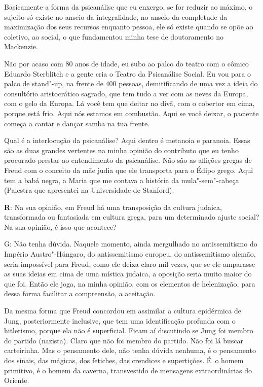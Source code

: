  

Basicamente a forma da psicanálise que eu enxergo, se for reduzir ao
máximo, o sujeito só existe no anseio da integralidade, no anseio da
completude da maximização dos seus recursos enquanto pessoa, ele só
existe quando se opõe ao coletivo, ao social, o que fundamentou minha
tese de doutoramento no Mackenzie.

 

Não por acaso com 80 anos de idade, eu subo ao palco do teatro com o
cômico Eduardo Sterblitch e a gente cria o Teatro da Psicanálise Social.
Eu vou para o palco de stand"-up, na frente de 400 pessoas, demitificando
de uma vez a ideia do consultório aristocrático sagrado, que tem tudo a
ver com as neves da Europa, com o gelo da Europa. Lá você tem que deitar
no divã, com o cobertor em cima, porque está frio. Aqui nós estamos em
combustão. Aqui se você deixar, o paciente começa a cantar e dançar
samba na tua frente.

 

Qual é a interlocução da psicanálise? Aqui dentro é metanoia e paranoia.
Essas são as duas grandes vertentes na minha opinião do contributo que
eu tenho procurado prestar ao entendimento da psicanálise. Não são as
aflições gregas de Freud com o conceito da mãe judia que ele transporta
para o Édipo grego. Aqui tem a babá negra, a Maria que me contava a
história da mula"-sem"-cabeça (Palestra que apresentei na Universidade de
Stanford).

 

\textbf{R}: Na sua opinião, em Freud há uma transposição da cultura
judaica, transformada ou fantasiada em cultura grega, para um
determinado ajuste social? Na sua opinião, é isso que acontece?

 

G: Não tenha dúvida. Naquele momento, ainda mergulhado no antissemitismo
do Império Austro"-Húngaro, do antissemitismo europeu, do antissemitismo
alemão, seria impossível para Freud, como ele deixa claro mil vezes, que
se ele amparasse as suas ideias em cima de uma mística judaica, a oposição seria muito maior do que foi. Então ele joga, na minha opinião,
com os elementos de helenização, para dessa forma facilitar a
compreensão, a aceitação.

 

Da mesma forma que Freud concordou em assimilar a cultura epidérmica de
Jung, posteriormente inclusive, que tem uma identificação profunda com o
hitlerismo, porque ela não é superficial. Ficam aí discutindo se Jung
foi membro do partido (nazista). Claro que não foi membro do partido.
Não foi lá buscar carteirinha. Mas o pensamento dele, não tenha dúvida
nenhuma, é o pensamento dos sinais, das mágicas, dos fetiches, das
crendices e supertições. É~o homem primitivo, é o homem da caverna,
transvestido de mensagens extraordinárias do Oriente.

